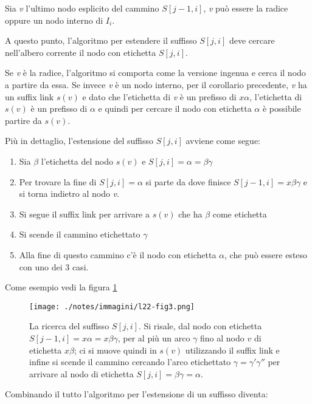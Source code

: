Sia \textit{v} l'ultimo nodo esplicito del cammino $ S[j-1,i] $, \textit{v} può essere la radice oppure un nodo interno di $ I_i $.

A questo punto, l'algoritmo per estendere il suffisso $ S[j,i] $ deve cercare nell'albero corrente il nodo con etichetta $ S[j,i] $.

Se \textit{v} è la radice, l'algoritmo si comporta come la versione ingenua e cerca il nodo a partire da essa.
Se invece \textit{v} è un nodo interno, per il corollario precedente, \textit{v} ha un suffix link $ s(v) $ e dato che l'etichetta di \textit{v} è un prefisso di $ x\alpha $, l'etichetta di $ s(v) $ è un prefisso di $\alpha$ e quindi per cercare il nodo con etichetta $ \alpha $ è possibile partire da $ s(v) $.

Più in dettaglio, l'estensione del suffisso $ S[j,i] $ avviene come segue:

\begin{enumerate}
	\item Sia $\beta$ l'etichetta del nodo $ s(v) $ e $ S[j,i] = \alpha = \beta\gamma $
	\item Per trovare la fine di $ S[j,i] = \alpha $ si parte da dove finisce $ S[j-1,i] = x\beta\gamma $ e si torna indietro al nodo \textit{v}.
	\item Si segue il suffix link per arrivare a $s(v)$ che ha $\beta$ come etichetta
	\item Si scende il cammino etichettato $\gamma$
	\item Alla fine di questo cammino c'è il nodo con etichetta $\alpha$, che può essere esteso con uno dei 3 casi.
\end{enumerate}

Come esempio vedi la figura \ref{sadefe2}

\begin{figure}[htbp]
	\centering
	\texttt{[image: ./notes/immagini/l22-fig3.png]}
	\caption{La ricerca del suffisso $ S[j,i] $. Si risale, dal nodo con etichetta $ S[j-1,i] = x\alpha = x\beta\gamma $, per al più un arco $\gamma$ fino al nodo $ v $ di etichetta $ x\beta $; ci si muove quindi in $ s(v) $ utilizzando il suffix link e infine si scende il cammino cercando l'arco etichettato $\gamma = \gamma'\gamma''$ per arrivare al nodo di etichetta $ S[j,i] = \beta\gamma =\alpha$.}\label{sadefe2}
\end{figure}

Combinando il tutto l'algoritmo per l'estensione di un suffisso diventa:

